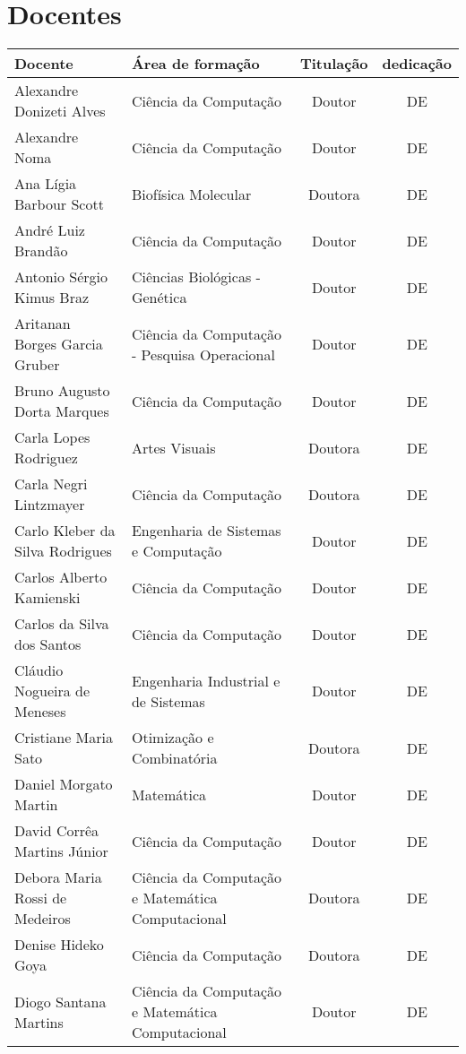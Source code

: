 \section {Docentes}

\begin{longtable}{|l|l|c|c|}
    \hline
    Docente & Área de formação & Titulação & dedicação\\
    \hline\hline
    Alexandre Donizeti Alves & Ciência da Computação & Doutor & DE \\
    Alexandre Noma & Ciência da Computação & Doutor & DE \\
    Ana Lígia Barbour Scott & Biofísica Molecular & Doutora & DE \\
    André Luiz Brandão & Ciência da Computação & Doutor & DE \\
    Antonio Sérgio Kimus Braz & Ciências Biológicas - Genética & Doutor & DE \\
    Aritanan Borges Garcia Gruber & Ciência da Computação - Pesquisa Operacional & Doutor & DE \\
    Bruno Augusto Dorta Marques & Ciência da Computação & Doutor & DE \\
    Carla Lopes Rodriguez & Artes Visuais & Doutora & DE \\
    Carla Negri Lintzmayer & Ciência da Computação & Doutora & DE \\
    Carlo Kleber da Silva Rodrigues & Engenharia de Sistemas e Computação & Doutor & DE \\
    Carlos Alberto Kamienski & Ciência da Computação & Doutor & DE \\
    Carlos da Silva dos Santos & Ciência da Computação & Doutor & DE \\
    Cláudio Nogueira de Meneses & Engenharia Industrial e de Sistemas & Doutor & DE \\
    Cristiane Maria Sato & Otimização e Combinatória & Doutora & DE \\
    Daniel Morgato Martin & Matemática & Doutor & DE \\
    David Corrêa Martins Júnior & Ciência da Computação & Doutor & DE \\
    Debora Maria Rossi de Medeiros & Ciência da Computação e Matemática Computacional & Doutora & DE \\
    Denise Hideko Goya & Ciência da Computação & Doutora & DE \\
    Diogo Santana Martins & Ciência da Computação e Matemática Computacional & Doutor & DE \\

\end{longtable}

